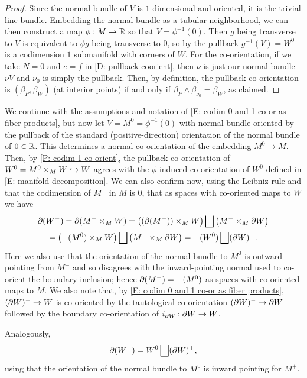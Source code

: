 \begin{proof}
	Since the normal bundle of $V$ is $1$-dimensional and oriented, it is the trivial line bundle.
	Embedding the normal bundle as a tubular neighborhood, we can then construct a map $\phi: M \to \mathbb{R}$ so that $V = \phi^{-1}(0)$.
	Then $g$ being transverse to $V$ is equivalent to $\phi g$ being transverse to $0$, so by \cite[Proposition 4.2.9]{MaDo92} the pullback $g^{-1}(V) = W^0$ is a codimension $1$ submanifold with corners of $W$.
	For the co-orientation, if we take $N = 0$ and $e = f$ in \cref{D: pullback coorient}, then $\nu$ is just our normal bundle $\nu V$ and $\nu_0$ is simply the pullback.
	Then, by definition, the pullback co-orientation is $(\beta_P, \beta_W)$ (at interior points) if and only if $\beta_P \wedge \beta_{\nu_0} = \beta_W$, as claimed.
\end{proof}

\begin{example}\label{E: codim 1 pullbacks}
	We continue with the assumptions and notation of \cref{E: codim 0 and 1 co-or as fiber products}, but now let $V = M^0 = \phi^{-1}(0)$ with normal bundle oriented by the pullback of the standard (positive-direction) orientation of the normal bundle of $0 \in \mathbb{R}$.
	This determines a normal co-orientation of the embedding $M^0 \to M$.
	Then, by \cref{P: codim 1 co-orient}, the pullback co-orientation of $W^0 = M^0 \times_M W \hookrightarrow W$ agrees with the $\phi$-induced co-orientation of $W^0$ defined in \cref{E: manifold decomposition}.
	We can also confirm now, using the Leibniz rule and that the codimension of $M^-$ in $M$ is $0$, that as spaces with co-oriented maps to $W$ we have
	\begin{multline*}
		\partial(W^-) = \partial(M^- \times_M W) = \left( (\partial (M^-)) \times_M W \right) \bigsqcup \left( M^- \times_M \partial W \right)\\
		= \left( -(M^0) \times_M W \right) \bigsqcup \left( M^- \times_M \partial W \right)= -(W^0) \bigsqcup (\partial W)^-.
	\end{multline*}
	Here we also use that the orientation of the normal bundle to $M^0$ is outward pointing from $M^-$ and so disagrees with the inward-pointing normal used to co-orient the boundary inclusion; hence $\partial(M^-) = -(M^0)$ as spaces with co-oriented maps to $M$.
	We also note that, by \cref{E: codim 0 and 1 co-or as fiber products}, $(\partial W)^- \to W$ is co-oriented by the tautological co-orientation $(\partial W)^- \to \partial W$ followed by the boundary co-orientation of $i_{\partial W} \colon \partial W \to W$.

	Analogously,
	$$\partial (W^+) = W^0 \bigsqcup (\partial W)^+,$$
	using that the orientation of the normal bundle to $M^0$ is inward pointing for $M^+$.
\end{example}

